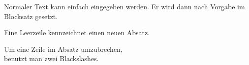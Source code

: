 \documentclass{article}
\begin{document}
Normaler Text kann einfach eingegeben werden. Er wird dann nach Vorgabe im Blocksatz gesetzt.

Eine Leerzeile kennzeichnet einen neuen Absatz.

Um eine Zeile im Absatz umzubrechen, \\ benutzt man zwei Blackslashes.
\end{document}
